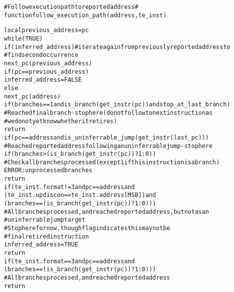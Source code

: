 \begin{alltt}
# Follow execution path to reported address #
function follow_execution_path(address, te_inst)

  local previous_address = pc
  while (TRUE)
    if (inferred_address) # iterate again from previously reported address to
                          #   find second occurrence
      next_pc(previous_address)
      if (pc == previous_address)
        inferred_address = FALSE
    else
      next_pc(address)
      if (branches == 1 and is_branch(get_instr(pc)) and stop_at_last_branch)
        # Reached final branch - stop here (do not follow to next instruction as
        #  we do not yet know whether it retires)
        return
      if (pc == address and is_uninferrable_jump(get_instr(last_pc)))
        # Reached reported address following an uninferrable jump - stop here
        if (branches > (is_branch(get_instr(pc)) ? 1 : 0))
          # Check all branches processed (except 1 if this instruction is a branch)
          ERROR: unprocessed branches
        return
      if (te_inst.format != 3 and pc == address and
        (te_inst.updiscon == te_inst.address[MSB]) and
          (branches == (is_branch(get_instr(pc)) ? 1 : 0)))
            # All branches processed, and reached reported address, but not as an
            #   uninferrable jump target
            # Stop here for now, though flag indicates this may not be
            #  final retired instruction
        inferred_address = TRUE
        return
      if (te_inst.format == 3 and pc == address and
        (branches == (is_branch(get_instr(pc)) ? 1 : 0)))
        # All branches processed, and reached reported address
        return
\end{alltt}

\pagebreak

